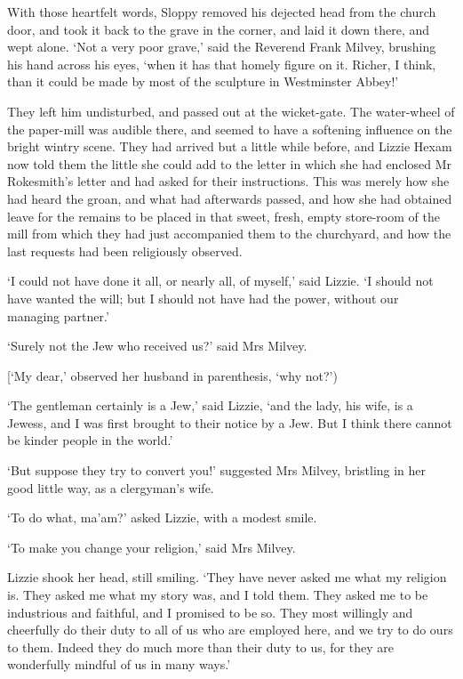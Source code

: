 With those heartfelt words, Sloppy removed his dejected head from the
church door, and took it back to the grave in the corner, and laid it
down there, and wept alone. ‘Not a very poor grave,’ said the Reverend
Frank Milvey, brushing his hand across his eyes, ‘when it has that
homely figure on it. Richer, I think, than it could be made by most of
the sculpture in Westminster Abbey!’

They left him undisturbed, and passed out at the wicket-gate. The
water-wheel of the paper-mill was audible there, and seemed to have a
softening influence on the bright wintry scene. They had arrived but a
little while before, and Lizzie Hexam now told them the little she could
add to the letter in which she had enclosed Mr Rokesmith’s letter and
had asked for their instructions. This was merely how she had heard the
groan, and what had afterwards passed, and how she had obtained leave
for the remains to be placed in that sweet, fresh, empty store-room of
the mill from which they had just accompanied them to the churchyard,
and how the last requests had been religiously observed.

‘I could not have done it all, or nearly all, of myself,’ said Lizzie.
‘I should not have wanted the will; but I should not have had the power,
without our managing partner.’

‘Surely not the Jew who received us?’ said Mrs Milvey.

[‘My dear,’ observed her husband in parenthesis, ‘why not?’)

‘The gentleman certainly is a Jew,’ said Lizzie, ‘and the lady, his
wife, is a Jewess, and I was first brought to their notice by a Jew. But
I think there cannot be kinder people in the world.’

‘But suppose they try to convert you!’ suggested Mrs Milvey, bristling
in her good little way, as a clergyman’s wife.

‘To do what, ma’am?’ asked Lizzie, with a modest smile.

‘To make you change your religion,’ said Mrs Milvey.

Lizzie shook her head, still smiling. ‘They have never asked me what
my religion is. They asked me what my story was, and I told them. They
asked me to be industrious and faithful, and I promised to be so.
They most willingly and cheerfully do their duty to all of us who are
employed here, and we try to do ours to them. Indeed they do much more
than their duty to us, for they are wonderfully mindful of us in many
ways.’

